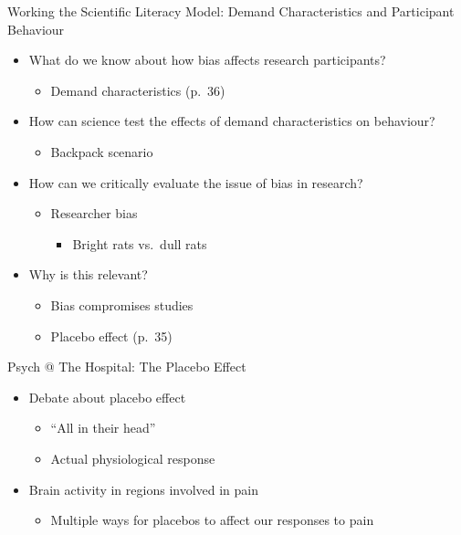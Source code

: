 \documentclass[
]{book}
\providecommand{\tightlist}{%
  \setlength{\itemsep}{0pt}\setlength{\parskip}{0pt}}
\begin{document}
Working the Scientific Literacy Model: Demand Characteristics and
Participant Behaviour

\begin{itemize}
\tightlist
\item
  What do we know about how bias affects research participants?

  \begin{itemize}
  \tightlist
  \item
    Demand characteristics (p.~36)\\
  \end{itemize}
\item
  How can science test the effects of demand characteristics on behaviour?

  \begin{itemize}
  \tightlist
  \item
    Backpack scenario\\
  \end{itemize}
\item
  How can we critically evaluate the issue of bias in research?

  \begin{itemize}
  \tightlist
  \item
    Researcher bias

    \begin{itemize}
    \tightlist
    \item
      Bright rats vs.~dull rats\\
    \end{itemize}
  \end{itemize}
\item
  Why is this relevant?

  \begin{itemize}
  \tightlist
  \item
    Bias compromises studies\\
  \item
    Placebo effect (p.~35)
  \end{itemize}
\end{itemize}

Psych @ The Hospital: The Placebo Effect

\begin{itemize}
\tightlist
\item
  Debate about placebo effect

  \begin{itemize}
  \tightlist
  \item
    ``All in their head''\\
  \item
    Actual physiological response\\
  \end{itemize}
\item
  Brain activity in regions involved in pain

  \begin{itemize}
  \tightlist
  \item
    Multiple ways for placebos to affect our responses to pain
  \end{itemize}
\end{itemize}
\end{document}
